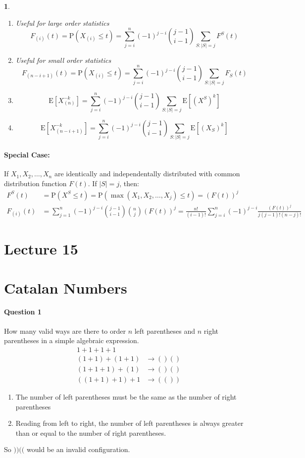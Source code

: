 \documentclass[english,12pt]{article}
\theoremstyle{plain}
\newtheorem*{proposition}{\protect\propositionname}
\theoremstyle{definition}
\theoremstyle{definition} %
\newcommand{\prop}[1]{\begin{proposition} #1 \end{proposition} }
\providecommand{\propositionname}{Proposition}
\newcommand{\enum}[1]{\begin{enumerate} #1 \end{enumerate}}
\newcommand{\ex}[1]{\mbox{E} \left[ #1 \right]}
\begin{document}
\prop{\


\enum{
\item Useful for large order statistics
\[F_{(i)}(t)
=\text{P}(X_{(i)}\le t)
=\sum\limits_{j=i}^n(-1)^{j-i}{j-1\choose i-1}\sum\limits_{S:|S|=j}F^S(t)\]

\item Useful for small order statistics
\[F_{(n-i+1)}(t)
=\text{P}(X_{(i)}\le t)
=\sum\limits_{j=i}^n(-1)^{j-i}{j-1\choose i-1}\sum\limits_{S:|S|=j}F_S(t)\]

\item
\[\ex{X_{(n)}^{-k}}=\sum\limits_{j=i}^n(-1)^{j-i}{j-1\choose i-1}\sum\limits_{S:|S|=j}\ex{(X^S)^k}\]

\item
\[\ex{X_{(n-i+1)}^{-k}}=\sum\limits_{j=i}^n(-1)^{j-i}{j-1\choose i-1}\sum\limits_{S:|S|=j}\ex{(X_S)^k}\]
}
}

\paragraph{Special Case: }If $X_1,X_2,\ldots,X_n$ are identically and independentally distributed with common distribution function $F(t)$.  If $|S|=j$, then:
\begin{align*}
F^S(t)&=\text{P}(X^S\le t)
=\text{P}(\max(X_1,X_2,\ldots,X_j)\le t)
=(F(t))^j\\
F_{(i)}(t)&=\sum\limits_{j=1}^n(-1)^{j-i}{j-1\choose i-1}{n\choose j}(F(t))^j
=\frac{n!}{(i-1)!}\sum\limits_{j=i}^n(-1)^{j-i}\frac{(F(t))^j}{j(j-1)!(n-j)!}
\end{align*}

\section*{Lecture 15}
\section{Catalan Numbers}
\paragraph{Question 1}
How many valid ways are there to order $n$ left parentheses and $n$ right parentheses in a simple algebraic expression.
\begin{align*}
1+1+1+1&\\
(1+1)+(1+1)&\rightarrow()()\\
(1+1+1)+(1)&\rightarrow()()\\
((1+1)+1)+1&\rightarrow(())
\end{align*}
\enum{
\item The number of left parentheses must be the same as the number of right parentheses
\item Reading from left to right, the number of left parentheses is always greater than or equal to the number of right parentheses.
}
So $))(($ would be an invalid configuration.
\end{document}
